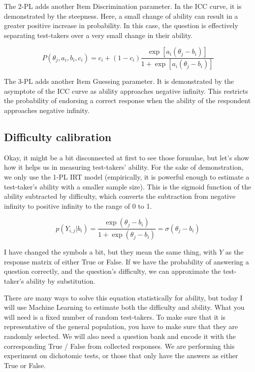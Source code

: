 \documentclass{article}
\begin{document}
The 2-PL adds another Item Discrimination parameter. In the ICC curve, it is demonstrated by the steepness. Here, a small change of ability can result in a greater positive increase in probability. In this case, the question is effectively separating test-takers over a very small change in their ability.

\[
P(\theta_j,a_i,b_i,c_i)=c_i+(1-c_i)\frac{\exp\left[a_i(\theta_j-b_i)\right]}{1+\exp\left[a_i(\theta_j-b_i)\right]}
\]

The 3-PL adds another Item Guessing parameter. It is demonstrated by the asymptote of the ICC curve as ability approaches negative infinity. This restricts the probability of endorsing a correct response when the ability of the respondent approaches negative infinity.

\subsection*{Difficulty calibration}

Okay, it might be a bit disconnected at first to see those formulae, but let’s show how it helps us in measuring test-takers’ ability. For the sake of demonstration, we only use the 1-PL IRT model (empirically, it is powerful enough to estimate a test-taker’s ability with a smaller sample size). This is the sigmoid function of the ability subtracted by difficulty, which converts the subtraction from negative infinity to positive infinity to the range of 0 to 1.

\[
p\left(Y_{i,j}|b_i\right)=\frac{\exp(\theta_j-b_i)}{1+\exp(\theta_j-b_i)}=\sigma(\theta_j-b_i)
\]

I have changed the symbols a bit, but they mean the same thing, with $Y$ as the response matrix of either True or False. If we have the probability of answering a question correctly, and the question’s difficulty, we can approximate the test-taker’s ability by substitution.

There are many ways to solve this equation statistically for ability, but today I will use Machine Learning to estimate both the difficulty and ability. What you will need is a fixed number of random test-takers. To make sure that it is representative of the general population, you have to make sure that they are randomly selected. We will also need a question bank and encode it with the corresponding True / False from collected responses. We are performing this experiment on dichotomic tests, or those that only have the answers as either True or False.
\end{document}
